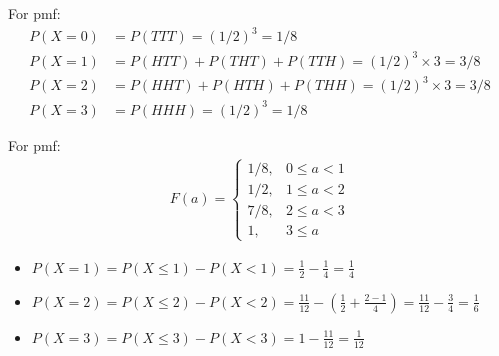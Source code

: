 \documentclass[slidestop,compress,mathserif]{beamer}
\begin{document}
\begin{frame}


\pause
For pmf:
\begin{align*}
P(X = 0) &= P(TTT)  = (1 / 2)^3 = 1 / 8 \\
P(X = 1) &=  P(HTT) + P(THT) + P(TTH) = (1 / 2)^3 \times 3 = 3 / 8\\
P(X = 2) &= P(HHT) + P(HTH) + P(THH) = (1 / 2)^3 \times 3 = 3 / 8\\
P(X = 3) &= P(HHH) = (1 / 2)^3 = 1 / 8 
\end{align*}

\pause
For pmf:
\begin{align*}
F(a)= 
\begin{cases}
    1 / 8,& 0 \leq a < 1\\
    1 / 2,& 1 \leq a < 2 \\
    7 / 8,& 2 \leq a < 3 \\
    1, & 3 \leq a
\end{cases}
\end{align*}
\end{frame}


\begin{frame}


\pause

\begin{itemize}
\item $P(X = 1) = P(X \leq 1) - P(X < 1) = \frac{1}{2} - \frac{1}{4} = \frac{1}{4}$\\ \pause
\item $P(X = 2) = P(X \leq 2) - P(X < 2) = \frac{11}{12} - (\frac{1}{2} + \frac{2 - 1}{4}) = \frac{11}{12} - \frac{3}{4} = \frac{1}{6}$ \\ \pause
\item $P(X = 3) = P(X \leq 3) - P(X < 3) = 1 - \frac{11}{12} = \frac{1}{12}$
\end{itemize}

\end{frame}
\end{document}
